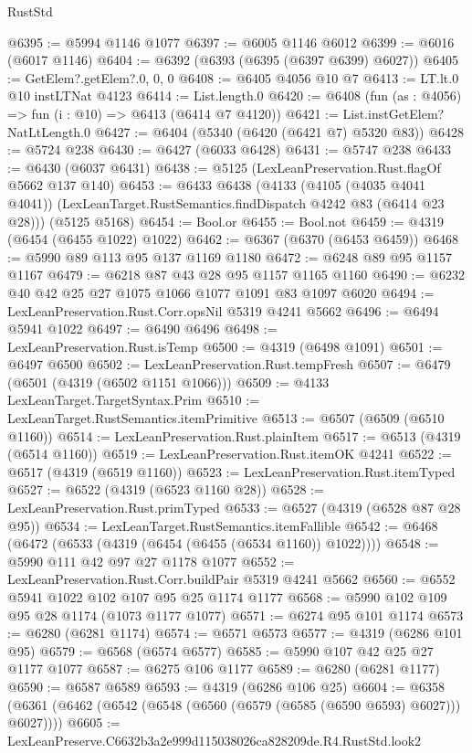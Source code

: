 \begin{lexlean}{RustStd}
\begin{coremodule}
@6395 := @5994 @1146 @1077
@6397 := @6005 @1146 @6012
@6399 := @6016 (@6017 @1146)
@6404 := @6392 (@6393 (@6395 (@6397 @6399) @6027))
@6405 := GetElem?.getElem?.{0, 0, 0}
@6408 := @6405 @4056 @10 @7
@6413 := LT.lt.{0} @10 instLTNat @4123
@6414 := List.length.{0}
@6420 := @6408 (fun (as : @4056) => fun (i : @10) => @6413 (@6414 @7 @4120))
@6421 := List.instGetElem?NatLtLength.{0}
@6427 := @6404 (@5340 (@6420 (@6421 @7) @5320 @83))
@6428 := @5724 @238
@6430 := @6427 (@6033 @6428)
@6431 := @5747 @238
@6433 := @6430 (@6037 @6431)
@6438 := @5125 (LexLeanPreservation.Rust.flagOf @5662 @137 @140)
@6453 := @6433
    @6438
    (@4133
      (@4105 (@4035 @4041 @4041))
      (LexLeanTarget.RustSemantics.findDispatch @4242 @83 (@6414 @23 @28)))
    (@5125 @5168)
@6454 := Bool.or
@6455 := Bool.not
@6459 := @4319 (@6454 (@6455 @1022) @1022)
@6462 := @6367 (@6370 (@6453 @6459))
@6468 := @5990 @89 @113 @95 @137 @1169 @1180
@6472 := @6248 @89 @95 @1157 @1167
@6479 := @6218 @87 @43 @28 @95 @1157 @1165 @1160
@6490 := @6232 @40 @42 @25 @27 @1075 @1066 @1077 @1091 @83 @1097 @6020
@6494 := LexLeanPreservation.Rust.Corr.opsNil @5319 @4241 @5662
@6496 := @6494 @5941 @1022
@6497 := @6490 @6496
@6498 := LexLeanPreservation.Rust.isTemp
@6500 := @4319 (@6498 @1091)
@6501 := @6497 @6500
@6502 := LexLeanPreservation.Rust.tempFresh
@6507 := @6479 (@6501 (@4319 (@6502 @1151 @1066)))
@6509 := @4133 LexLeanTarget.TargetSyntax.Prim
@6510 := LexLeanTarget.RustSemantics.itemPrimitive
@6513 := @6507 (@6509 (@6510 @1160))
@6514 := LexLeanPreservation.Rust.plainItem
@6517 := @6513 (@4319 (@6514 @1160))
@6519 := LexLeanPreservation.Rust.itemOK @4241
@6522 := @6517 (@4319 (@6519 @1160))
@6523 := LexLeanPreservation.Rust.itemTyped
@6527 := @6522 (@4319 (@6523 @1160 @28))
@6528 := LexLeanPreservation.Rust.primTyped
@6533 := @6527 (@4319 (@6528 @87 @28 @95))
@6534 := LexLeanTarget.RustSemantics.itemFallible
@6542 := @6468 (@6472 (@6533 (@4319 (@6454 (@6455 (@6534 @1160)) @1022))))
@6548 := @5990 @111 @42 @97 @27 @1178 @1077
@6552 := LexLeanPreservation.Rust.Corr.buildPair @5319 @4241 @5662
@6560 := @6552 @5941 @1022 @102 @107 @95 @25 @1174 @1177
@6568 := @5990 @102 @109 @95 @28 @1174 (@1073 @1177 @1077)
@6571 := @6274 @95 @101 @1174
@6573 := @6280 (@6281 @1174)
@6574 := @6571 @6573
@6577 := @4319 (@6286 @101 @95)
@6579 := @6568 (@6574 @6577)
@6585 := @5990 @107 @42 @25 @27 @1177 @1077
@6587 := @6275 @106 @1177
@6589 := @6280 (@6281 @1177)
@6590 := @6587 @6589
@6593 := @4319 (@6286 @106 @25)
@6604 := @6358 (@6361 (@6462 (@6542 (@6548 (@6560 (@6579 (@6585 (@6590 @6593) @6027))) @6027))))
@6605 := LexLeanPreserve.C6632b3a2e999d115038026ca828209de.R4.RustStd.look2

\end{coremodule}
\end{lexlean}
